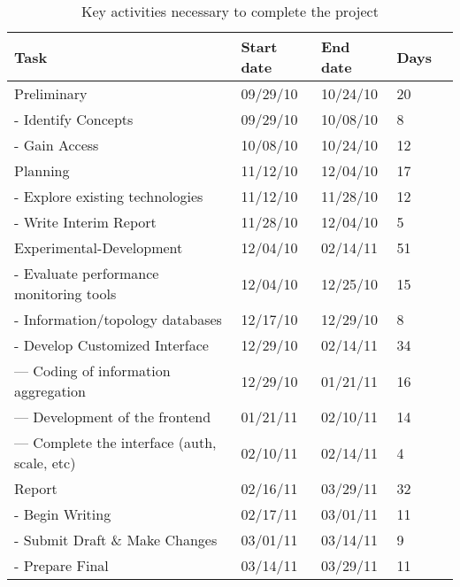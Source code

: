 \begin{table}[ht]
\begin{tabular}{ | l | l | l | l | r |}
\hline
Task & Start date & End date & Days \\ \hline
  Preliminary & 09/29/10 & 10/24/10 & 20 \\ \hline 
  -  Identify Concepts & 09/29/10 & 10/08/10 & 8 \\ \hline 
  -  Gain Access & 10/08/10 & 10/24/10 & 12 \\ \hline 
  Planning & 11/12/10 & 12/04/10 & 17 \\ \hline 
  -  Explore existing technologies & 11/12/10 & 11/28/10 & 12 \\ \hline 
  -  Write Interim Report & 11/28/10 & 12/04/10 & 5 \\ \hline 
  Experimental-Development & 12/04/10 & 02/14/11 & 51 \\ \hline 
  -  Evaluate performance monitoring tools & 12/04/10 & 12/25/10 & 15 \\ \hline 
  -  Information/topology databases & 12/17/10 & 12/29/10 & 8 \\ \hline 
  -  Develop Customized Interface & 12/29/10 & 02/14/11 & 34 \\ \hline 
  ---    Coding of information aggregation & 12/29/10 & 01/21/11 & 16 \\ \hline 
  ---    Development of the frontend & 01/21/11 & 02/10/11 & 14 \\ \hline 
  ---    Complete the interface (auth, scale, etc) & 02/10/11 & 02/14/11 & 4 \\
      \hline Report & 02/16/11 & 03/29/11 & 32 \\ \hline 
  -  Begin Writing & 02/17/11 & 03/01/11 & 11 \\ \hline 
  -  Submit Draft \& Make Changes & 03/01/11 & 03/14/11 & 9 \\ \hline 
  -  Prepare Final & 03/14/11 & 03/29/11 & 11 \\ \hline 
\end{tabular}
\caption{Key activities necessary to complete the project}
\label{tab:tasks}
\end{table}




